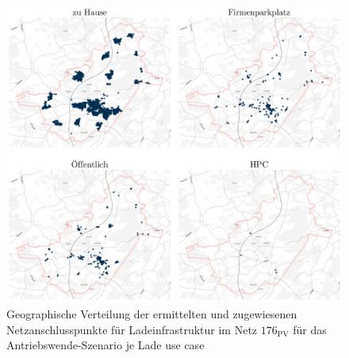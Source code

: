 \begin{figure}[H]
    \centering
    \includegraphics[width=\textwidth]{Bilder/cps_in_grid_176}
    \caption[Geographische Verteilung der ermittelten und zugewiesenen Netzanschlusspunkte für Ladeinfrastruktur im Netz \num{176} für das Antriebswende-Szenario je Lade use case]{Geographische Verteilung der ermittelten und zugewiesenen Netzanschlusspunkte für Ladeinfrastruktur im Netz \(176_{\text{PV}}\) für das Antriebswende-Szenario je Lade use case}\label{fig:cps_in_grid}
\end{figure}